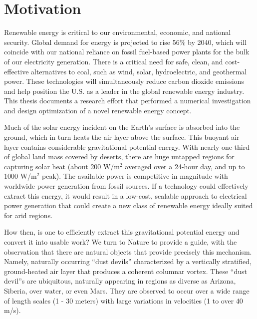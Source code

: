 \label{sec:intro}

%
%


\section{Motivation}

Renewable energy is critical to our environmental, economic, and
national security. Global demand for energy is projected to rise 56\% by
2040\cite{energy-outlook}, which will coincide with our national
reliance on fossil fuel-based power plants for the bulk of our
electricity generation. There is a critical need for safe, clean, and 
cost-effective alternatives to coal, such as wind, solar, hydroelectric,
and geothermal power. These technologies will simultaneously reduce
carbon dioxide emissions and help position the U.S. as a leader in the
global renewable energy industry. 
%
This thesis documents a research effort that performed a numerical 
investigation and design optimization of a novel renewable energy concept. 

Much of the solar energy incident on the Earth's surface is absorbed
into the ground, which in turn heats the air layer above the surface.
This buoyant air layer contains considerable gravitational potential
energy. 
With nearly one-third of global land mass covered by deserts, there are huge
untapped regions for capturing solar heat (about 200 W/$\text{m}^2$
averaged over a 24-hour day, and up to 1000 W/$\text{m}^2$
peak)\cite{Hoyt197827}. The available power is competitive in magnitude
with worldwide power generation from fossil sources. If a technology
could effectively extract this energy, it would result in a low-cost,
scalable approach to electrical power generation that could create a new
class of renewable energy ideally suited for arid regions.  

How then, is one to efficiently extract this gravitational potential
energy and convert it into usable work? We turn to Nature to provide a 
guide, with the observation that there are natural objects that provide
precisely this mechanism. Namely, naturally occurring ``dust devils'' 
characterized by a vertically stratified, ground-heated air layer
that produces a coherent columnar vortex. These ``dust devil''s are
ubiquitous, naturally appearing in regions as diverse as Arizona,
Siberia, over water, or even
Mars\cite{Sinclair1969,ROG:ROG1635,JGRE:JGRE1660}.  
They are observed to occur over a wide range of length scales (1 - 30
meters) with large variations in velocities (1 to over 40
m/s)\cite{Sinclair1969}. 

